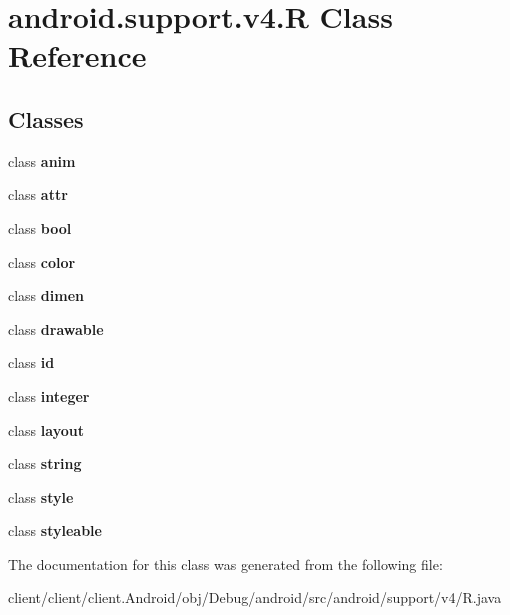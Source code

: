 \hypertarget{classandroid_1_1support_1_1v4_1_1R}{}\section{android.\+support.\+v4.\+R Class Reference}
\label{classandroid_1_1support_1_1v4_1_1R}
\subsection*{Classes}
\begin{DoxyCompactItemize}
\item 
class {\bfseries anim}
\item 
class {\bfseries attr}
\item 
class {\bfseries bool}
\item 
class {\bfseries color}
\item 
class {\bfseries dimen}
\item 
class {\bfseries drawable}
\item 
class {\bfseries id}
\item 
class {\bfseries integer}
\item 
class {\bfseries layout}
\item 
class {\bfseries string}
\item 
class {\bfseries style}
\item 
class {\bfseries styleable}
\end{DoxyCompactItemize}


The documentation for this class was generated from the following file\+:\begin{DoxyCompactItemize}
\item 
client/client/client.\+Android/obj/\+Debug/android/src/android/support/v4/R.\+java\end{DoxyCompactItemize}
